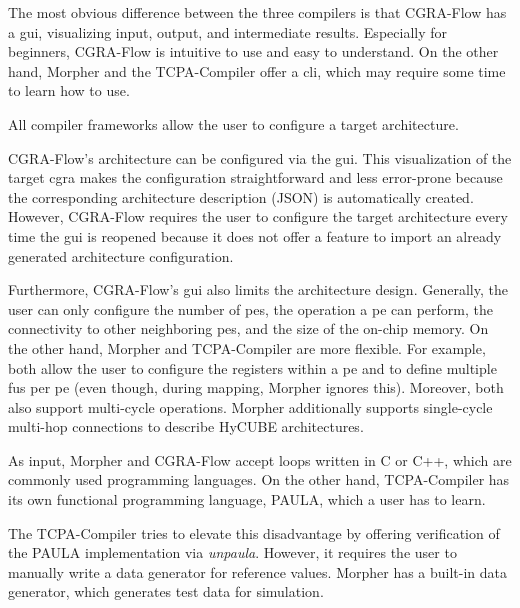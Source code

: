 The most obvious difference between the three compilers is that CGRA-Flow has a \acf{gui}, visualizing input, output, and intermediate results.
Especially for beginners, CGRA-Flow is intuitive to use and easy to understand.
On the other hand, Morpher and the TCPA-Compiler offer a \acf{cli}, which may require some time to learn how to use.

All compiler frameworks allow the user to configure a target architecture.

CGRA-Flow's architecture can be configured via the \ac{gui}.
This visualization of the target \ac{cgra} makes the configuration straightforward and less error-prone because the corresponding architecture description (JSON) is automatically created.
However, CGRA-Flow requires the user to configure the target architecture every time the \ac{gui} is reopened because it does not offer a feature to import an already generated architecture configuration.

Furthermore, CGRA-Flow's \ac{gui} also limits the architecture design.
Generally, the user can only configure the number of \acp{pe}, the operation a \ac{pe} can perform, the connectivity to other neighboring \acp{pe}, and the size of the on-chip memory.
On the other hand, Morpher and TCPA-Compiler are more flexible.
For example, both allow the user to configure the registers within a \ac{pe} and to define multiple \acp{fu} per \ac{pe} (even though, during mapping, Morpher ignores this).
Moreover, both also support multi-cycle operations.
Morpher additionally supports single-cycle multi-hop connections to describe HyCUBE architectures\footnotemark.


As input, Morpher and CGRA-Flow accept loops written in C or C++, which are commonly used programming languages.
On the other hand, TCPA-Compiler has its own functional programming language, PAULA, which a user has to learn.

The TCPA-Compiler tries to elevate this disadvantage by offering verification of the PAULA implementation via \textit{unpaula}.
However, it requires the user to manually write a data generator for reference values.
Morpher has a  built-in data generator, which generates test data for simulation.

